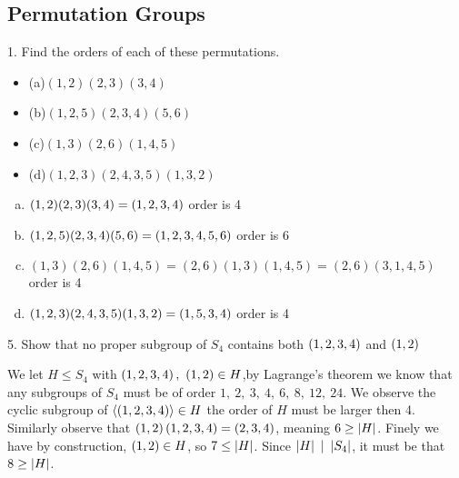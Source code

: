 \subsection{Permutation Groups}
\begin{mdframed}[style=darkQuesion]
  1. Find the orders of each of these permutations.
  \begin{itemize}
    \item []{(a)$(1,2)(2,3)(3,4)$}
    \item []{(b)$(1,2,5)(2,3,4)(5,6)$}
    \item []{(c)$(1,3)(2,6)(1,4,5)$}
    \item []{(d)$(1,2,3)(2,4,3,5)(1,3,2)$}
  \end{itemize}
\end{mdframed}
\begin{mdframed}[style=darkAnswer,frametitle={Joe Starr}]
  \begin{enumerate}[(a)]
    \item{$(1,2)(2,3)(3,4)=\left(1,2,3,4\right)$ order is 4}
    \item{$(1,2,5)(2,3,4)(5,6)=\left(1,2,3,4,5,6\right)$ order is 6}
    \item{$(1,3)(2,6)(1,4,5)=(2,6)(1,3)(1,4,5)=(2,6)(3,1,4,5)$ order is 4}
    \item{$(1,2,3)(2,4,3,5)(1,3,2)=\left(1,5,3,4\right)$ order is 4}
  \end{enumerate} 
\end{mdframed}
\newpage
\begin{mdframed}[style=darkQuesion]
  5. Show that no proper subgroup of $S_4$ contains both $\left(1,2,3,4\right)$ and $\left(1,2\right)$
\end{mdframed}
\begin{mdframed}[style=darkAnswer,frametitle={Joe Starr}]
 We let $H\leq S_4$ with $\left(1,2,3,4\right),\ \left(1,2\right)\in H$,by Lagrange's theorem 
 we know that any subgroups of $S_4$ must be of order 
 $1,\ 2,\ 3,\ 4,\ 6,\ 8,\ 12,\ 24$. We observe the cyclic subgroup of 
 $\left<\left(1,2,3,4\right)\right>\in H$ the order of $H$ must 
 be larger then 4. Similarly observe that $\left(1,2\right)\left(1,2,3,4\right)=\left(2,3,4\right)$, meaning 
 $6\geq\left\vert H\right\vert$. Finely we have by construction, $\left(1,2\right)\in H$, so $7\leq\left\vert H\right\vert$. 
 Since $\left\vert H\right\vert\ \vert\  \left\vert S_4\right\vert$, it must be that $8\geq\left\vert H\right\vert$. 

\end{mdframed}
